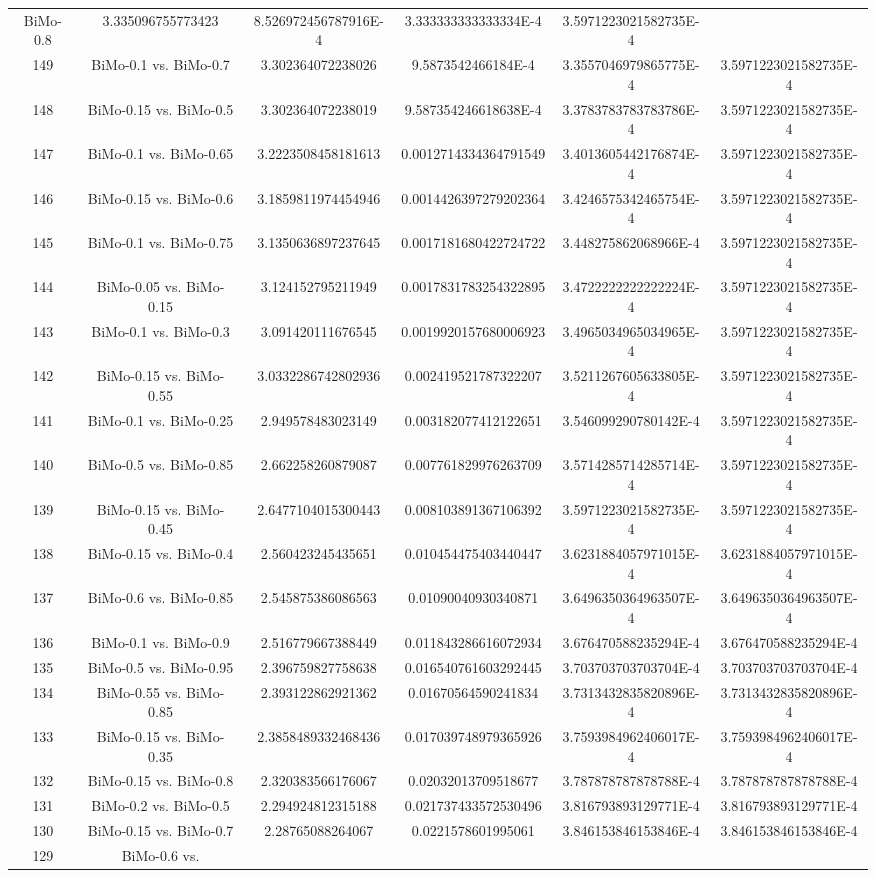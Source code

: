 \documentclass[a4paper,10pt]{article}
\begin{document}
\begin{landscape}
\begin{table}[!htp]
\begin{tabular}{cccccc}
BiMo-0.8&3.335096755773423&8.526972456787916E-4&3.333333333333334E-4&3.5971223021582735E-4\\149&BiMo-0.1 vs. BiMo-0.7&3.302364072238026&9.5873542466184E-4&3.3557046979865775E-4&3.5971223021582735E-4\\148&BiMo-0.15 vs. BiMo-0.5&3.302364072238019&9.587354246618638E-4&3.3783783783783786E-4&3.5971223021582735E-4\\147&BiMo-0.1 vs. BiMo-0.65&3.2223508458181613&0.0012714334364791549&3.4013605442176874E-4&3.5971223021582735E-4\\146&BiMo-0.15 vs. BiMo-0.6&3.1859811974454946&0.0014426397279202364&3.4246575342465754E-4&3.5971223021582735E-4\\145&BiMo-0.1 vs. BiMo-0.75&3.1350636897237645&0.0017181680422724722&3.448275862068966E-4&3.5971223021582735E-4\\144&BiMo-0.05 vs. BiMo-0.15&3.124152795211949&0.0017831783254322895&3.4722222222222224E-4&3.5971223021582735E-4\\143&BiMo-0.1 vs. BiMo-0.3&3.091420111676545&0.0019920157680006923&3.4965034965034965E-4&3.5971223021582735E-4\\142&BiMo-0.15 vs. BiMo-0.55&3.0332286742802936&0.002419521787322207&3.5211267605633805E-4&3.5971223021582735E-4\\141&BiMo-0.1 vs. BiMo-0.25&2.949578483023149&0.003182077412122651&3.546099290780142E-4&3.5971223021582735E-4\\140&BiMo-0.5 vs. BiMo-0.85&2.662258260879087&0.007761829976263709&3.5714285714285714E-4&3.5971223021582735E-4\\139&BiMo-0.15 vs. BiMo-0.45&2.6477104015300443&0.008103891367106392&3.5971223021582735E-4&3.5971223021582735E-4\\138&BiMo-0.15 vs. BiMo-0.4&2.560423245435651&0.010454475403440447&3.6231884057971015E-4&3.6231884057971015E-4\\137&BiMo-0.6 vs. BiMo-0.85&2.545875386086563&0.01090040930340871&3.6496350364963507E-4&3.6496350364963507E-4\\136&BiMo-0.1 vs. BiMo-0.9&2.516779667388449&0.011843286616072934&3.676470588235294E-4&3.676470588235294E-4\\135&BiMo-0.5 vs. BiMo-0.95&2.396759827758638&0.016540761603292445&3.703703703703704E-4&3.703703703703704E-4\\134&BiMo-0.55 vs. BiMo-0.85&2.393122862921362&0.01670564590241834&3.7313432835820896E-4&3.7313432835820896E-4\\133&BiMo-0.15 vs. BiMo-0.35&2.3858489332468436&0.017039748979365926&3.7593984962406017E-4&3.7593984962406017E-4\\132&BiMo-0.15 vs. BiMo-0.8&2.320383566176067&0.02032013709518677&3.787878787878788E-4&3.787878787878788E-4\\131&BiMo-0.2 vs. BiMo-0.5&2.294924812315188&0.021737433572530496&3.816793893129771E-4&3.816793893129771E-4\\130&BiMo-0.15 vs. BiMo-0.7&2.28765088264067&0.0221578601995061&3.846153846153846E-4&3.846153846153846E-4\\129&BiMo-0.6 vs. 
\end{tabular}
\end{table}
\end{landscape}
\end{document}
